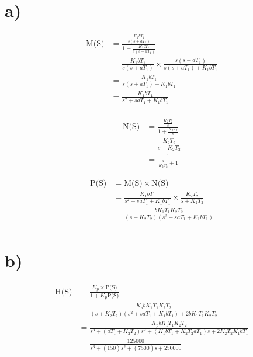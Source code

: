 \documentclass{article}
\begin{document}


\section*{a)} %
\label{sec:a_}
\begin{align*}
    \text{M(S)} &= \frac{\frac{K_1bT_1}{s(s+aT_1)}}{1+\frac{K_1bT_1}{s(s+aT_1)}}\\
                &= \frac{K_1bT_1}{s(s+aT_1)} \times \frac{s(s+aT_1)}{{s(s+aT_1)} + K_1bT_1}\\
                &= \frac{K_1bT_1}{{s(s+aT_1)} + K_1bT_1}\\
                &= \frac{K_1bT_1}{s^2 + saT_1 + K_1bT_1}\\
\end{align*}


\begin{align*}
    \text{N(S)} &= \frac{\frac{K_2T_2}{s}}{1 + \frac{K_2T_2}{s}}\\
                &= \frac{K_2T_2}{s + K_2T_2}\\
                &= \frac{1}{\frac{s}{K_2T_2} + 1}
\end{align*}


\begin{align*}
    \text{P(S)} &= \text{M(S)} \times \text{N(S)}\\
                &= \frac{K_1bT_1}{s^2 + saT_1 + K_1bT_1} \times \frac{K_2T_2}{s + K_2T_2}\\
                &= \frac{bK_1T_1K_2T_2}{(s + K_2T_2)(s^2 + saT_1 + K_1bT_1)}\\
\end{align*}

\section*{b)} %
\label{sec:b_}
\begin{align*}
    \text{H(S)} &=  \frac{K_p \times\text{P(S)}}{1 + K_p\text{P(S)}}\\
                &= \frac{K_pbK_1T_1K_2T_2}{(s + K_2T_2)(s^2 + saT_1 + K_1bT_1) + 2bK_1T_1K_2T_2}\\
                &= \frac{K_pbK_1T_1K_2T_2}{s^3 + (aT_1 + K_2T_2)s^2 + (K_1bT_1 + K_2T_2aT_1)s + 2K_2T_2K_1bT_1}\\
                &= \frac{125000}{s^3 + (150)s^2 + (7500)s + 250000}\\
\end{align*}
\end{document}
